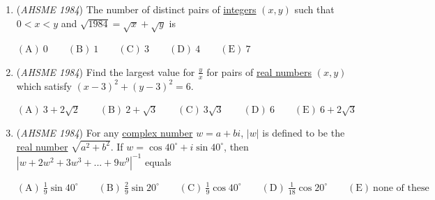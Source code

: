 \begin{enumerate}
 <a href="/wiki/index.php?title=File:AHSME-1984-Q27.jpg" title="File:AHSME-1984-Q27.jpg">Error creating thumbnail: Unable to save thumbnail to destination</a>
$\mathrm{(A) \ }\sqrt{2} \qquad \mathrm{(B) \ }\sqrt{3} \qquad \mathrm{(C) \ } \sqrt[3]{2} \qquad \mathrm{(D) \ }\sqrt[3]{3} \qquad \mathrm{(E) \ } \sqrt[4]{3}$


	\item (\textit{AHSME 1984}) The number of distinct pairs of \href{https://artofproblemsolving.com/wiki/index.php?title=Integers}{integers} $(x, y)$ such that $0<x<y$ and $\sqrt{1984}=\sqrt{x}+\sqrt{y}$ is


 $\mathrm{(A) \ }0 \qquad \mathrm{(B) \ }1 \qquad \mathrm{(C) \ } 3 \qquad \mathrm{(D) \ }4 \qquad \mathrm{(E) \ } 7$


	\item (\textit{AHSME 1984}) Find the largest value for $\frac{y}{x}$ for pairs of \href{https://artofproblemsolving.com/wiki/index.php?title=Real\_numbers}{real numbers} $(x, y)$ which satisfy $(x-3)^2+(y-3)^2=6$.


 $\mathrm{(A) \ }3+2\sqrt{2} \qquad \mathrm{(B) \ }2+\sqrt{3} \qquad \mathrm{(C) \ } 3\sqrt{3} \qquad \mathrm{(D) \ }6 \qquad \mathrm{(E) \ } 6+2\sqrt{3}$


	\item (\textit{AHSME 1984}) For any \href{https://artofproblemsolving.com/wiki/index.php?title=Complex\_number}{complex number} $w=a+bi$, $|w|$ is defined to be the \href{https://artofproblemsolving.com/wiki/index.php?title=Real\_number}{real number} $\sqrt{a^2+b^2}$. If $w=\cos40^\circ+i\sin40^\circ$, then
$|w+2w^2+3w^3+...+9w^9|^{-1}$ equals


 $\mathrm{(A) \ }\frac{1}{9}\sin40^\circ \qquad \mathrm{(B) \ }\frac{2}{9}\sin20^\circ \qquad \mathrm{(C) \ } \frac{1}{9}\cos40^\circ \qquad \mathrm{(D) \ }\frac{1}{18}\cos20^\circ \qquad \mathrm{(E) \ } \text{none of these}$


\end{enumerate}
